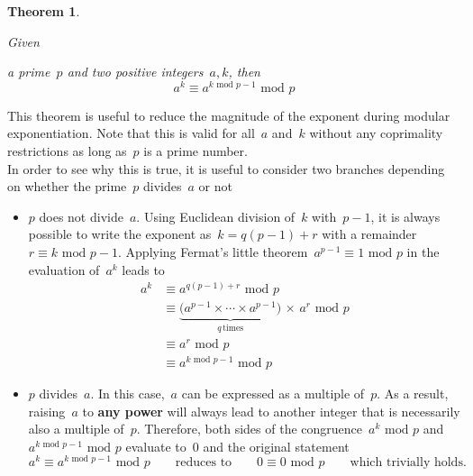 \documentclass{article}
\newtheorem{theorem}{Theorem}
\begin{document}
\begin{theorem}
\hypertarget{theorem4}{Given} a prime~$p$ and two positive integers~$a, k$, then 
\begin{equation*}
a^k \equiv a^{k \,\,\text{mod}\,\,p-1} \,\,\text{mod}\,\, p
\end{equation*}
\end{theorem}
This theorem is useful to reduce the magnitude of the exponent during modular exponentiation.  Note that this is valid for all~$a$ and~$k$ without any coprimality restrictions as long as~$p$ is a prime number. \\

\noindent In order to see why this is true, it is useful to consider two branches depending on whether the prime~$p$ divides~$a$ or not
\begin{itemize}
\item $p$ does not divide~$a$. Using Euclidean division of~$k$ with~$p-1$, it is always possible to write the exponent as~$k = q(p-1) + r$ with a remainder~$r \equiv k \,\,\text{mod}\,\,p-1$.  Applying Fermat's little theorem~$a^{p-1}\equiv 1\,\,\text{mod}\,\,p$ in the evaluation of~$a^k$ leads to
\begin{align*}
a^k &\equiv a^{q(p-1) + r} \,\,\text{mod}\,\, p \\
&\equiv \underbrace{\big( a^{p-1} \times \cdots \times a^{p-1} \big)}_{q \, \text{times}} \, \times \, a^r  \,\,\text{mod}\,\, p \\
&\equiv a^r \,\,\text{mod}\,\, p \\
&\equiv a^{k \,\,\text{mod}\,\,p-1} \,\,\text{mod}\,\, p
\end{align*}
\item $p$ divides~$a$. In this case,~$a$ can be expressed as a multiple of~$p$.  As a result, raising~$a$ to {\bf any power} will always lead to another integer that is necessarily also a multiple of~$p$.  Therefore, both sides of the congruence~$a^k \,\,\text{mod}\,\, p$ and~$a^{k \,\,\text{mod}\,\,p-1} \,\,\text{mod}\,\, p$ evaluate to~$0$ and the original statement
\begin{equation*}
a^k \equiv a^{k \,\,\text{mod}\,\, p-1} \,\,\text{mod}\,\, p \quad \quad \text{reduces to} \quad \quad 0 \equiv 0 \,\,\text{mod}\,\, p \quad \quad \text{which trivially holds.}
\end{equation*}
\end{itemize}
\end{document}
